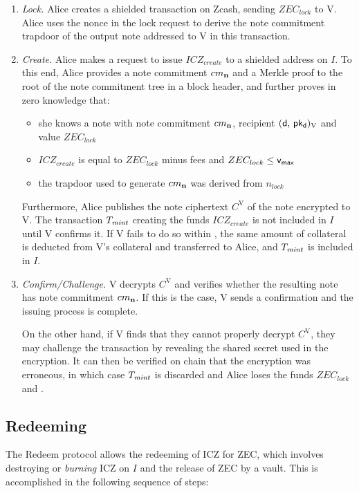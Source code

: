 \begin{enumerate}
    \item \emph{Lock.} Alice creates a shielded transaction on Zcash, sending $ZEC_{lock}$ to V.
    Alice uses the nonce in the lock request to derive the note commitment trapdoor of the output note \n addressed to V in this transaction.
    
    \item \emph{Create.} Alice makes a request to issue $ICZ_{create}$ to a shielded address on $I$.
    To this end, Alice provides a note commitment $cm_\mathbf{n}$ and a Merkle proof to the root of the note commitment tree in a block header, and further proves in zero knowledge that:
    \begin{itemize}
        \item she knows a note \n with note commitment $cm_\mathbf{n}$, recipient $(\mathsf{d},\, \mathsf{pk_d})_\text{V}$ and value $ZEC_{lock}$
        \item $ICZ_{create}$ is equal to $ZEC_{lock}$ minus fees and $ZEC_{lock} \leq \mathsf{v_{max}}$
        \item the trapdoor used to generate $cm_\mathbf{n}$ was derived from $n_{lock}$
    \end{itemize}
    Furthermore, Alice publishes the note ciphertext $C^{\text{V}}$ of the note \n encrypted to V.
    The transaction $T_{\mathit{mint}}$ creating the funds $ICZ_{create}$ is not included in $I$ until V confirms it.
    If V fails to do so within \dci, the same amount of collateral \iw is deducted from V's collateral and transferred to Alice, and $T_{\mathit{mint}}$ is included in $I$.
    
    \item \emph{Confirm/Challenge.} V decrypts $C^{\text{V}}$ and verifies whether the resulting note has note commitment $cm_\mathbf{n}$.
    If this is the case, V sends a confirmation and the issuing process is complete.
    
    On the other hand, if V finds that they cannot properly decrypt $C^{\text{V}}$, they may challenge the transaction by revealing the shared secret used in the encryption.
    It can then be verified on chain that the encryption was erroneous, in which case $T_{\mathit{mint}}$ is discarded and Alice loses the funds $ZEC_{lock}$ and \iw.
\end{enumerate}

\subsection{Redeeming}
\label{sec:redeeming_hl}

The Redeem protocol allows the redeeming of ICZ for ZEC, which involves destroying or \emph{burning} ICZ on $I$ and the release of ZEC by a vault.
This is accomplished in the following sequence of steps:

